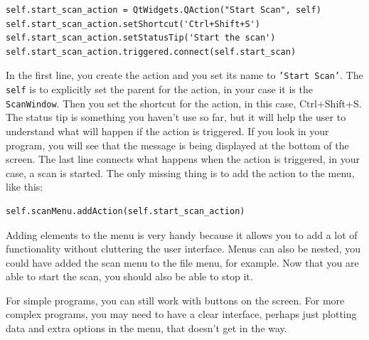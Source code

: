 \begin{verbatim}
self.start_scan_action = QtWidgets.QAction("Start Scan", self)
self.start_scan_action.setShortcut('Ctrl+Shift+S')
self.start_scan_action.setStatusTip('Start the scan')
self.start_scan_action.triggered.connect(self.start_scan)
\end{verbatim}

In the first line, you create the action and you set its name to \texttt{'Start
Scan'}. The \texttt{self} is to explicitly set the parent for the
action, in your case it is the \texttt{ScanWindow}. Then you set the
shortcut for the action, in this case, Ctrl+Shift+S. The status tip is
something you haven't use so far, but it will help the user to
understand what will happen if the action is triggered. If you look in
your program, you will see that the message is being displayed at the
bottom of the screen. The last line connects what happens when the
action is triggered, in your case, a scan is started. The only missing
thing is to add the action to the menu, like this:

\begin{verbatim}
self.scanMenu.addAction(self.start_scan_action)
\end{verbatim}


Adding elements to the menu is very handy because it allows you to add a
lot of functionality without cluttering the user interface. Menus can
also be nested, you could have added the scan menu to the file menu, for
example. Now that you are able to start the scan, you should also be
able to stop it.


For simple programs, you can still work with buttons on the screen. For
more complex programs, you may need to have a clear interface, perhaps
just plotting data and extra options in the menu, that doesn't get in
the way.

